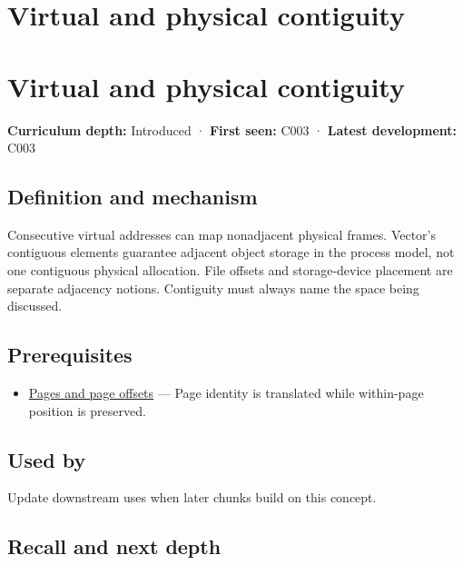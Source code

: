 \hypertarget{appendix-f897c1ddac8f}{}
\section*{Virtual and physical contiguity}
\section{Virtual and physical contiguity}\label{appendix-f897c1ddac8f-virtual-and-physical-contiguity}

\textbf{Curriculum depth:} Introduced · \textbf{First seen:} C003 · \textbf{Latest development:} C003

\subsection{Definition and mechanism}\label{appendix-f897c1ddac8f-definition-and-mechanism}

Consecutive virtual addresses can map nonadjacent physical frames. Vector's contiguous elements guarantee adjacent object storage in the process model, not one contiguous physical allocation. File offsets and storage-device placement are separate adjacency notions. Contiguity must always name the space being discussed.

\subsection{Prerequisites}\label{appendix-f897c1ddac8f-prerequisites}

\begin{itemize}
\tightlist
\item
  \hyperref[appendix-0c67cd5bf30a]{Pages and page offsets} --- Page identity is translated while within-page position is preserved.
\end{itemize}

\subsection{Used by}\label{appendix-f897c1ddac8f-used-by}

Update downstream uses when later chunks build on this concept.

\subsection{Recall and next depth}\label{appendix-f897c1ddac8f-recall-and-next-depth}

